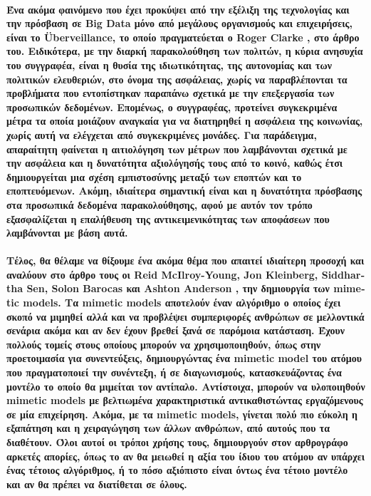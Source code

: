 \documentclass[12pt, A4]{article}
\newcommand{\tl}{\textlatin}
\begin{document}
    \paragraph{Ένα ακόμα φαινόμενο που έχει προκύψει από την εξέλιξη της τεχνολογίας και την πρόσβαση σε \tl{Big Data} μόνο από μεγάλους οργανισμούς και επιχειρήσεις, είναι το \tl{Überveillance}, το οποίο πραγματεύεται ο \tl{Roger Clarke} \cite{article4}, στο άρθρο του. Ειδικότερα, με την διαρκή παρακολούθηση των πολιτών, η κύρια ανησυχία του συγγραφέα, είναι η θυσία της ιδιωτικότητας, της αυτονομίας και των πολιτικών ελευθεριών, στο όνομα της ασφάλειας, χωρίς να παραβλέπονται τα προβλήματα που εντοπίστηκαν παραπάνω σχετικά με την επεξεργασία των προσωπικών δεδομένων. Επομένως, ο συγγραφέας, προτείνει συγκεκριμένα μέτρα τα οποία μοιάζουν αναγκαία για να διατηρηθεί η ασφάλεια της κοινωνίας, χωρίς αυτή να ελέγχεται από συγκεκριμένες μονάδες. Για παράδειγμα, απαραίτητη φαίνεται η αιτιολόγηση των μέτρων που λαμβάνονται σχετικά με την ασφάλεια και η δυνατότητα αξιολόγησής τους από το κοινό, καθώς έτσι δημιουργείται μια σχέση εμπιστοσύνης μεταξύ των εποπτών και το εποπτευόμενων. Ακόμη, ιδιαίτερα σημαντική είναι και η δυνατότητα πρόσβασης στα προσωπικά δεδομένα παρακολούθησης, αφού με αυτόν τον τρόπο εξασφαλίζεται η επαλήθευση της αντικειμενικότητας των αποφάσεων που λαμβάνονται με βάση αυτά.}

    \paragraph{Τέλος, θα θέλαμε να θίξουμε ένα ακόμα θέμα που απαιτεί ιδιαίτερη προσοχή και αναλύουν στο άρθρο τους οι \tl{Reid McIlroy-Young, Jon Kleinberg, Siddhartha Sen, Solon Barocas} και \tl{Ashton Anderson} \cite{article3}, την δημιουργία των \tl{mimetic models}. Τα \tl{mimetic models} αποτελούν έναν αλγόριθμο ο οποίος έχει σκοπό να μιμηθεί αλλά και να προβλέψει συμπεριφορές ανθρώπων σε μελλοντικά σενάρια ακόμα και αν δεν έχουν βρεθεί ξανά σε παρόμοια κατάσταση. Έχουν πολλούς τομείς στους οποίους μπορούν να χρησιμοποιηθούν, όπως στην προετοιμασία για συνεντεύξεις, δημιουργώντας ένα \tl{mimetic model} του ατόμου που πραγματοποιεί την συνέντεξη, ή σε διαγωνισμούς, κατασκευάζοντας ένα μοντέλο το οποίο θα μιμείται τον αντίπαλο. Αντίστοιχα, μπορούν να υλοποιηθούν \tl{mimetic models} με βελτιωμένα χαρακτηριστικά αντικαθιστώντας εργαζόμενους σε μία επιχείρηση. Ακόμα, με τα \tl{mimetic models}, γίνεται πολύ πιο εύκολη η εξαπάτηση και η χειραγώγηση των άλλων ανθρώπων, από αυτούς που τα διαθέτουν. Όλοι αυτοί οι τρόποι χρήσης τους, δημιουργούν στον αρθρογράφο αρκετές απορίες, όπως το αν θα μειωθεί η αξία του ίδιου του ατόμου αν υπάρχει ένας τέτοιος αλγόριθμος, ή το πόσο αξιόπιστο είναι όντως ένα τέτοιο μοντέλο και αν θα πρέπει να διατίθεται σε όλους.}
\end{document}
